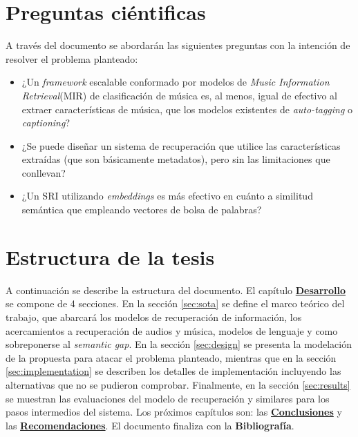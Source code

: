 \section{Preguntas ciéntificas}
A través del documento se abordarán las siguientes preguntas con la intención de resolver el problema planteado:
\begin{itemize}
    \item ¿Un \textit{framework} escalable conformado por modelos de \textit{Music Information Retrieval}(MIR) de clasificación de música es, al menos, igual de efectivo al extraer características de música, que los modelos existentes de \textit{auto-tagging} o \textit{captioning}?
    \item ¿Se puede diseñar un sistema de recuperación que utilice las características extraídas (que son básicamente metadatos), pero sin las limitaciones que conllevan?  %
    \item ¿Un SRI utilizando \textit{embeddings} es más efectivo en cuánto a similitud semántica que empleando vectores de bolsa de palabras? %
\end{itemize}
\section{Estructura de la tesis}
A continuación se describe la estructura del documento. El capítulo \hyperref[chap:development]{\textbf{Desarrollo}} se compone de 4 secciones. En la sección \ref{sec:sota} se define el marco teórico del trabajo, que abarcará los modelos de recuperación de información, los acercamientos a recuperación de audios y música, modelos de lenguaje y como sobreponerse al \textit{semantic gap}. En la sección \ref{sec:design} se presenta la modelación de la propuesta para atacar el problema planteado, mientras que en la sección \ref{sec:implementation} se describen los detalles de implementación incluyendo las alternativas que no se pudieron comprobar. Finalmente, en la sección \ref{sec:results}  se muestran las evaluaciones del modelo de recuperación y similares para los pasos intermedios del sistema. Los próximos capítulos son: las \hyperref[chap:conclusions]{\textbf{Conclusiones}} y las \hyperref[chap:recommendations]{\textbf{Recomendaciones}}. El documento finaliza con la \textbf{Bibliografía}.
